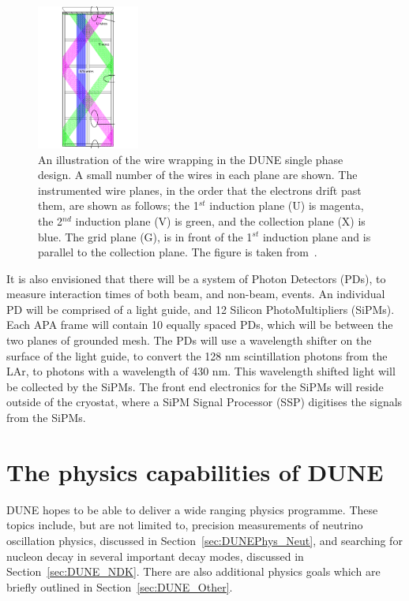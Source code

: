 \begin{figure}
  \centering
  \includegraphics[width=0.3\textwidth]{tpc_apa_cross_sections}
  \caption[An illustration of the wire wrapping in the DUNE single phase design]
          {An illustration of the wire wrapping in the DUNE single phase design. A small number of the wires in each plane are shown. The instrumented wire planes, in the order that the electrons drift past them, are shown as follows; the 1$^{st}$ induction plane (U) is magenta, the 2$^{nd}$ induction plane (V) is green, and the collection plane (X) is blue. The grid plane (G), is in front of the 1$^{st}$ induction plane and is parallel to the collection plane. The figure is taken from~\citep{DUNECDR_V4}.}  
  \label{fig:FDWireWrap}
\end{figure}

It is also envisioned that there will be a system of Photon Detectors (PDs), to measure interaction times of both beam, and non-beam, events. An individual PD will be comprised of a light guide, and 12 Silicon PhotoMultipliers (SiPMs). Each APA frame will contain 10 equally spaced PDs, which will be between the two planes of grounded mesh. The PDs will use a wavelength shifter on the surface of the light guide, to convert the 128 nm scintillation photons from the LAr, to photons with a wavelength of 430 nm. This wavelength shifted light will be collected by the SiPMs. The front end electronics for the SiPMs will reside outside of the cryostat, where a SiPM Signal Processor (SSP) digitises the signals from the SiPMs. \\

\section{The physics capabilities of DUNE} \label{sec:DUNEPhys}%
DUNE hopes to be able to deliver a wide ranging physics programme. These topics include, but are not limited to, precision measurements of neutrino oscillation physics, discussed in Section~\ref{sec:DUNEPhys_Neut}, and searching for nucleon decay in several important decay modes, discussed in Section~\ref{sec:DUNE_NDK}. There are also additional physics goals which are briefly outlined in Section~\ref{sec:DUNE_Other}. \\

